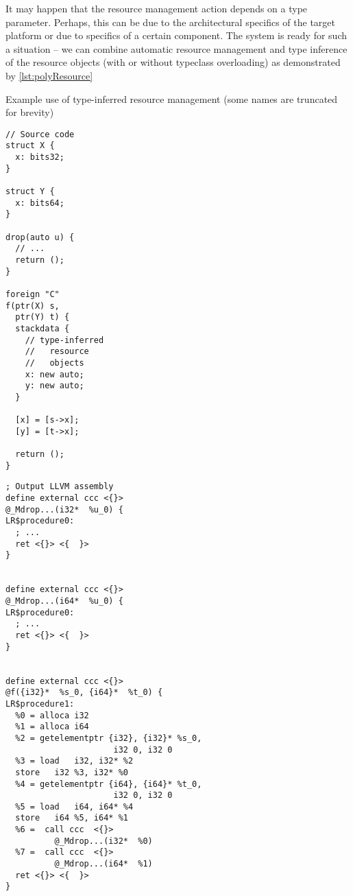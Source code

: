 It may happen that the resource management action depends on a type parameter. Perhaps, this can be due to the architectural specifics of the target platform or due to specifics of a certain component. The system is ready for such a situation -- we can combine automatic resource management and type inference of the resource objects (with or without typeclass overloading) as demonstrated by \cref{lst:polyResource}

\begin{codex}
    \small
    \caption{Example use of type-inferred resource management (some names are truncated for brevity)}
    \label{lst:polyResource}
    \begin{center}
    \begin{minipage}{0.4\linewidth}
    \begin{lstlisting}[basicstyle=\scriptsize\ttfamily]
// Source code
struct X {
  x: bits32;
}

struct Y {
  x: bits64;
}

drop(auto u) {
  // ...
  return ();
}

foreign "C"
f(ptr(X) s,
  ptr(Y) t) {
  stackdata {
    // type-inferred
    //   resource
    //   objects
    x: new auto;
    y: new auto;
  }

  [x] = [s->x];
  [y] = [t->x];

  return ();
}
    \end{lstlisting}
    \end{minipage}%
    \begin{minipage}{0.6\linewidth}
    \begin{lstlisting}[style=llvmStyle,basicstyle=\scriptsize\ttfamily]
; Output LLVM assembly
define external ccc <{}>
@_Mdrop...(i32*  %u_0) {
LR$procedure0:
  ; ...
  ret <{}> <{  }>
}


define external ccc <{}>
@_Mdrop...(i64*  %u_0) {
LR$procedure0:
  ; ...
  ret <{}> <{  }>
}


define external ccc <{}>
@f({i32}*  %s_0, {i64}*  %t_0) {
LR$procedure1:
  %0 = alloca i32
  %1 = alloca i64
  %2 = getelementptr {i32}, {i32}* %s_0,
                      i32 0, i32 0
  %3 = load   i32, i32* %2
  store   i32 %3, i32* %0
  %4 = getelementptr {i64}, {i64}* %t_0,
                      i32 0, i32 0
  %5 = load   i64, i64* %4
  store   i64 %5, i64* %1
  %6 =  call ccc  <{}>
          @_Mdrop...(i32*  %0)
  %7 =  call ccc  <{}>
          @_Mdrop...(i64*  %1)
  ret <{}> <{  }>
}
    \end{lstlisting}
    \end{minipage}
    \end{center}
\end{codex}

